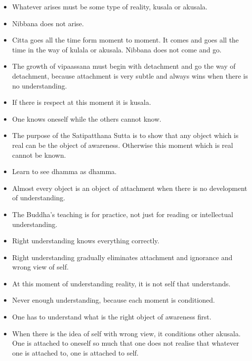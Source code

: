 \documentclass{article}
\begin{document}
\begin{itemize}
\item 
  Whatever arises must be some type of reality, kusala or akusala.

\item 
  Nibbana does not arise.

\item 
  Citta goes all the time form moment to moment. It comes and goes
  all the time in the way of kulala or akusala. Nibbana does not come
  and go.

\item 
  The growth of vipaassana must begin with detachment and go the way
  of detachment, because attachment is very subtle and always wins
  when there is no understanding.

\item 
  If there is respect at this moment it is kusala.

\item 
  One knows oneself while the others cannot know.

\item 
  The purpose of the Satipatthana Sutta is to show that any object
  which is real can be the object of awareness. Otherwise this moment
  which is real cannot be known.

\item 
  Learn to see dhamma as dhamma.

\item 
  Almost every object is an object of attachment when there is no
  development of understanding.

\item 
  The Buddha's teaching is for practice, not just for reading or
  intellectual understanding.

\item 
  Right understanding knows everything correctly.

\item 
  Right understanding gradually eliminates attachment and ignorance
  and wrong view of self.

\item 
  At this moment of understanding reality, it is not self that
  understands.

\item 
  Never enough understanding, because each moment is conditioned.

\item 
  One has to understand what is the right object of awareness first.

\item 
  When there is the idea of self with wrong view, it conditions other
  akusala. One is attached to oneself so much that one does not
  realise that whatever one is attached to, one is attached to self.


\end{itemize}
\end{document}
